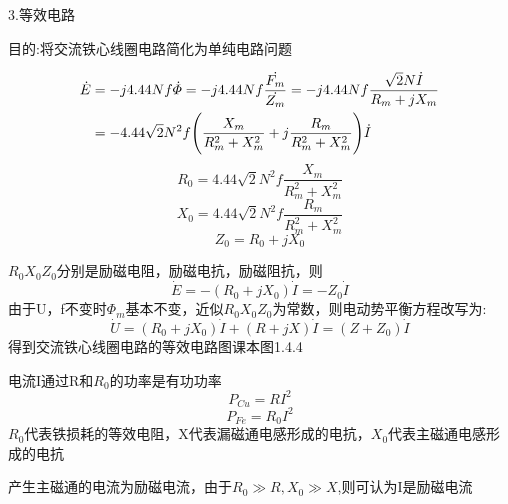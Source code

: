 \documentclass[11pt,twoside,a4paper]{ctexart}
\begin{document}
    3.等效电路

    目的:将交流铁心线圈电路简化为单纯电路问题

    \begin{align}
        \dot{E} & = -j4.44Nf\dot{\varPhi } =  -j4.44Nf\frac{\dot{F_m}}{\dot{Z_m}} = -j4.44Nf\frac{\sqrt{2}N\dot{I} }{R_m+jX_m}\notag \\
        & = -4.44\sqrt{2}N^2f\Biggl( \frac{X_m}{R_m^2 + X_m^2}+j\frac{R_m}{R_m^2+X_m^2}\Biggr) \dot{I} \notag
    \end{align}
    \[R_0 = 4.44\sqrt{2}N^2f\frac{X_m}{R_m^2 + X_m^2} \]
    \[X_0 = 4.44\sqrt{2}N^2f\frac{R_m}{R_m^2 + X_m^2} \]
    \[Z_0 = R_0 + jX_0 \]

    $R_0 X_0 Z_0 $分别是励磁电阻，励磁电抗，励磁阻抗，则
    \[\dot{E} = -(R_0 + jX_0)\dot{I} = -Z_0\dot{I} \]
    由于U，f不变时$\varPhi _m $基本不变，近似$R_0 X_0 Z_0 $为常数，则电动势平衡方程改写为:
    \[\dot{U} = (R_0 +jX_0)\dot{I} + (R + jX)\dot{I} = (Z + Z_0)\dot{I} \]
    得到交流铁心线圈电路的等效电路图课本图1.4.4

    电流I通过R和$R_0 $的功率是有功功率
    \[P_{Cu} = RI^2 \]
    \[P_{Fe} = R_0I^2\]
    $R_0 $代表铁损耗的等效电阻，X代表漏磁通电感形成的电抗，$X_0 $代表主磁通电感形成的电抗

    产生主磁通的电流为励磁电流，由于$R_0 \gg R , X_0 \gg X $,则可认为I是励磁电流
    
\end{document}
